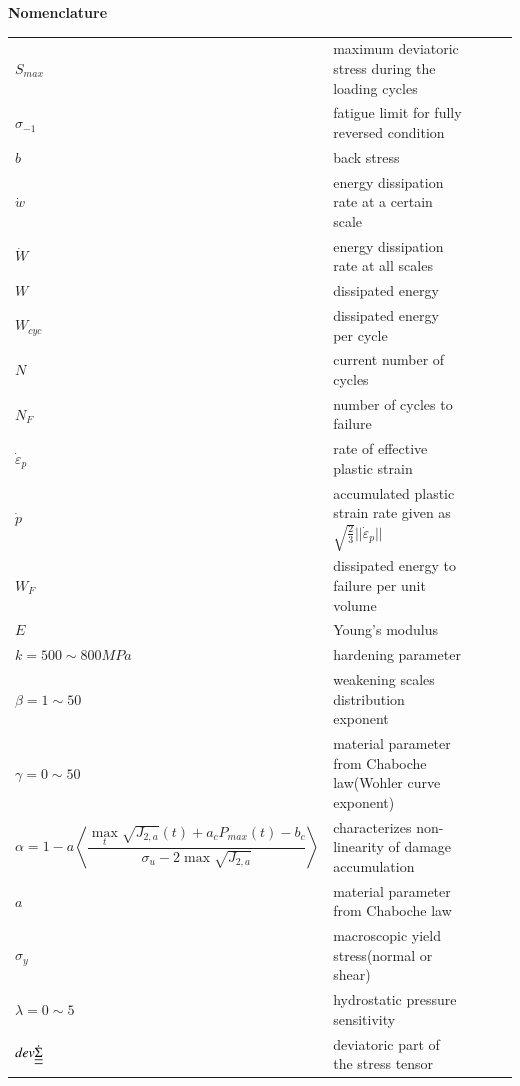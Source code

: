 \documentclass[3p,times,number,review]{elsarticle}
\begin{document}
\clearpage
\begin{flushleft}
	\textbf{Nomenclature}
	\vspace{6pt}
	\begin{table}[h]
		\begin{tabular}{lllll}
			$S_{max}$ & maximum deviatoric stress during the loading cycles &  &  &  \\
		    $\sigma_{-1}$ & fatigue limit for fully reversed condition  &  &  &  \\
			$b$ & back stress  &  &  &  \\
			$\dot{w}$ & energy dissipation rate at a certain scale &  &  &  \\
			$\dot{W}$ & energy dissipation rate at all scales &  &  &  \\
			$W$ & dissipated energy&  &  &  \\
			$W_{cyc}$ & dissipated energy per cycle &  &  &  \\
			$N$& current number of cycles &  &  &  \\
			$N_F$& number of cycles to failure &  &  &  \\
			 $ \dot{\varepsilon}_p$ & rate of effective plastic strain &  &  &  \\
			 $\dot{p}$ & accumulated plastic strain rate given as $\sqrt{\frac{2}{3}}||\dot{\varepsilon}_p||$ &  &  &  \\
			$W_F$ & dissipated energy to failure per unit volume &  &  &  \\
			$E$ & Young's modulus &  &  &  \\
			$k=500\sim800MPa$ & hardening parameter &  &  &  \\
			$\beta=1\sim50$ & weakening scales distribution exponent  &  &  &  \\
			$\gamma=0\sim50$ & material parameter from Chaboche law(Wohler curve exponent)  &  &  &  \\
			$\alpha=1 - a\left\langle \dfrac{\max\limits_{t}\sqrt{J_{2,a}}(t)+a_c{P_{max}(t)}-b_c}{ \sigma_{u} - 2\max\sqrt{J_{2,a}}}\right\rangle$ & characterizes non-linearity of damage accumulation &  &  &  \\
			$a$ & material parameter from Chaboche law &  &  &  \\
			$\sigma_{y}$ & macroscopic yield stress(normal or shear) &  &  &  \\
			$\lambda=0\sim5$& hydrostatic pressure sensitivity &  &  &  \\
			$dev\dot{\uline{\uline{\Sigma}}}$ & deviatoric part of the stress tensor &  &  &  \\

\end{tabular}
\end{table}
\end{flushleft}
\end{document}
